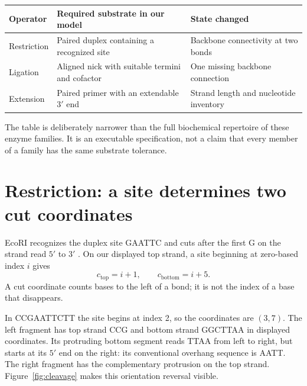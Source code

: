 \begin{center}
\begin{tabular}{p{.18\linewidth}p{.35\linewidth}p{.35\linewidth}}
\toprule
Operator & Required substrate in our model & State changed\\
\midrule
Restriction & Paired duplex containing a recognized site & Backbone connectivity at two bonds\\
Ligation & Aligned nick with suitable termini and cofactor & One missing backbone connection\\
Extension & Paired primer with an extendable $3'$ end & Strand length and nucleotide inventory\\
\bottomrule
\end{tabular}
\end{center}

The table is deliberately narrower than the full biochemical repertoire of these enzyme families. It is an executable specification, not a claim that every member of a family has the same substrate tolerance.

\section{Restriction: a site determines two cut coordinates}

EcoRI recognizes the duplex site GAATTC and cuts after the first G on the strand read $5'$ to $3'$ \cite{ecori}. On our displayed top strand, a site beginning at zero-based index $i$ gives
\begin{equation}
c_{\mathrm{top}}=i+1,\qquad c_{\mathrm{bottom}}=i+5.
\label{eq:cuts}
\end{equation}
A cut coordinate counts bases to the left of a bond; it is not the index of a base that disappears.


In CCGAATTCTT the site begins at index 2, so the coordinates are $(3,7)$. The left fragment has top strand CCG and bottom strand GGCTTAA in displayed coordinates. Its protruding bottom segment reads TTAA from left to right, but starts at its $5'$ end on the right: its conventional overhang sequence is AATT. The right fragment has the complementary protrusion on the top strand. Figure~\ref{fig:cleavage} makes this orientation reversal visible.

